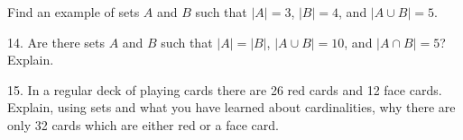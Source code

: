 \documentclass[10pt,]{book}
\theoremstyle{plain}
\theoremstyle{definition}
\theoremstyle{definition}
\numberwithin{equation}{chapter}
\begin{document}
\begin{exerciselist}
Find an example of sets \(A\) and \(B\) such that \(|A| = 3\), \(|B| = 4\), and \(|A \cup B| = 5\).%
\par\smallskip
\item[14.]\hypertarget{exercise-41}{}\hypertarget{p-540}{}%
Are there sets \(A\) and \(B\) such that \(|A| = |B|\), \(|A\cup B| = 10\), and \(|A\cap B| = 5\)? Explain.%
\par\smallskip
\item[15.]\hypertarget{exercise-42}{}\hypertarget{p-541}{}%
In a regular deck of playing cards there are 26 red cards and 12 face cards. Explain, using sets and what you have learned about cardinalities, why there are only 32 cards which are either red or a face card.%
\par\smallskip
\end{exerciselist}
\typeout{************************************************}
\typeout{************************************************}
\end{document}
